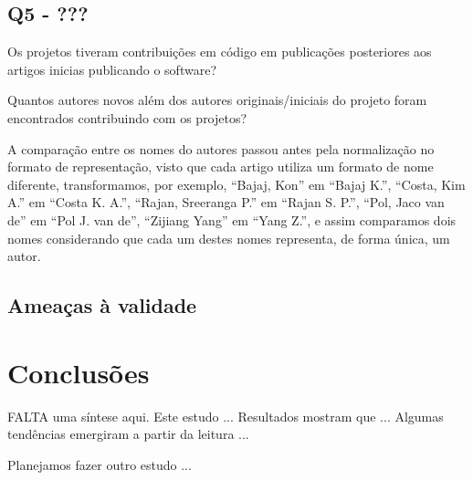 \subsection{Q5 - ???}

Os projetos tiveram contribuições em código em publicações posteriores aos
artigos inicias publicando o software?

Quantos autores novos além dos autores originais/iniciais do projeto
foram encontrados contribuindo com os projetos?

%

A comparação entre os nomes do autores passou antes pela normalização
no formato de representação, visto que cada artigo utiliza um formato
de nome diferente, transformamos, por exemplo, ``Bajaj, Kon'' em ``Bajaj K.'',
``Costa, Kim A.'' em ``Costa K. A.'', ``Rajan, Sreeranga P.'' em ``Rajan S. P.'',
``Pol, Jaco van de'' em ``Pol J. van de'', ``Zijiang Yang'' em ``Yang Z.'',
e assim comparamos dois nomes considerando que cada um destes nomes representa,
de forma única, um autor.

\subsection{Ameaças à validade}

\section{Conclusões}

FALTA uma síntese aqui. 
Este estudo ...
Resultados mostram que ...
Algumas tendências emergiram a partir da leitura ...

Planejamos fazer outro estudo ... 



%
%
%
%
%
%


